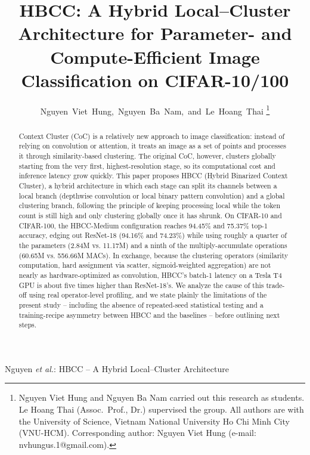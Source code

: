 \documentclass[journal]{IEEEtran}
\begin{document}
\title{HBCC: A Hybrid Local--Cluster Architecture for Parameter- and Compute-Efficient Image Classification on CIFAR-10/100}

\author{Nguyen~Viet~Hung,~Nguyen~Ba~Nam,~and~Le~Hoang~Thai%
\thanks{Nguyen Viet Hung and Nguyen Ba Nam carried out this research as students. Le Hoang Thai (Assoc.\ Prof., Dr.) supervised the group. All authors are with the University of Science, Vietnam National University Ho Chi Minh City (VNU-HCM). Corresponding author: Nguyen Viet Hung (e-mail: nvhungus.1@gmail.com).}}

%
{Nguyen \MakeLowercase{\textit{et al.}}: HBCC -- A Hybrid Local--Cluster Architecture}

\maketitle

\begin{abstract}
Context Cluster (CoC) is a relatively new approach to image classification: instead of relying on convolution or attention, it treats an image as a set of points and processes it through similarity-based clustering. The original CoC, however, clusters globally starting from the very first, highest-resolution stage, so its computational cost and inference latency grow quickly. This paper proposes HBCC (Hybrid Binarized Context Cluster), a hybrid architecture in which each stage can split its channels between a local branch (depthwise convolution or local binary pattern convolution) and a global clustering branch, following the principle of keeping processing local while the token count is still high and only clustering globally once it has shrunk. On CIFAR-10 and CIFAR-100, the HBCC-Medium configuration reaches 94.45\% and 75.37\% top-1 accuracy, edging out ResNet-18 (94.16\% and 74.23\%) while using roughly a quarter of the parameters (2.84M vs. 11.17M) and a ninth of the multiply-accumulate operations (60.65M vs. 556.66M MACs). In exchange, because the clustering operators (similarity computation, hard assignment via scatter, sigmoid-weighted aggregation) are not nearly as hardware-optimized as convolution, HBCC's batch-1 latency on a Tesla T4 GPU is about five times higher than ResNet-18's. We analyze the cause of this trade-off using real operator-level profiling, and we state plainly the limitations of the present study -- including the absence of repeated-seed statistical testing and a training-recipe asymmetry between HBCC and the baselines -- before outlining next steps.
\end{abstract}
\end{document}

